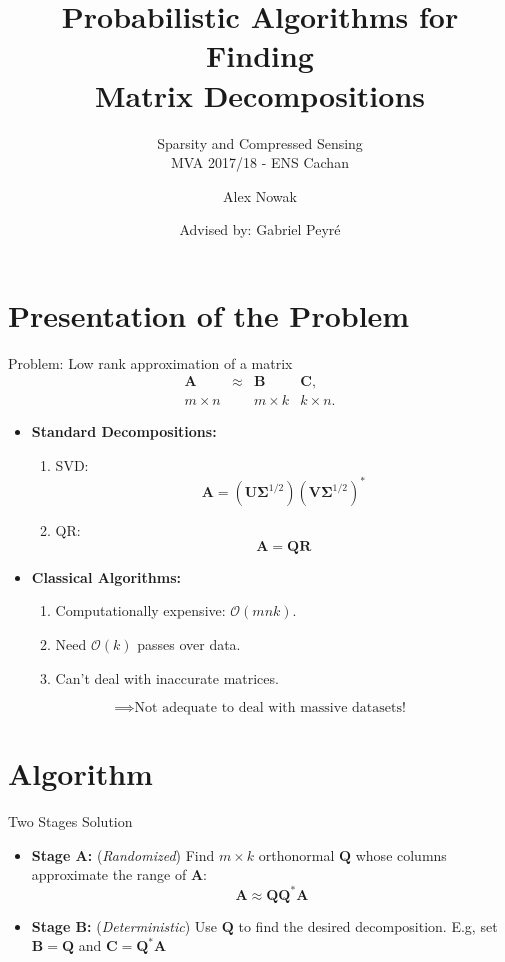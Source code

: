 \documentclass{beamer}
\title{Probabilistic Algorithms for Finding \\ Matrix Decompositions}
\subtitle{Sparsity and Compressed Sensing \\ MVA 2017/18 - ENS Cachan}
\author{Alex Nowak}
\date{Advised by: Gabriel Peyr\'e}
\newcommand{\mtx}[1]{\bm{#1}}
\newcommand{\adj}{*}
\begin{document}
\begin{frame}
  \titlepage
\end{frame}


\section{Presentation of the Problem}

\begin{frame}{Problem: Low rank approximation of a matrix}
  $$\begin{array}{ccccccccccc}
    \mtx{A} &\approx& \mtx{B} & \mtx{C},\\
    m\times n && m \times k & k\times n.
    \end{array}$$
  \begin{itemize}
  \item {
    \textbf{Standard Decompositions:}
    \begin{enumerate}
      \item SVD: $$\mtx{A}=\left(\mtx{U}\mtx{\Sigma}^{1/2}\right)\left(\mtx{V}\mtx{\Sigma}^{1/2}\right)^\adj$$
      \item QR: $$\mtx{A}=\mtx{Q}\mtx{R}$$
    \end{enumerate}
  }
  \item {
    \textbf{Classical Algorithms:}
    \begin{enumerate}
      \item Computationally expensive: $\mathcal{O}(mnk)$.
      \item Need $\mathcal{O}(k)$ passes over data.
      \item Can't deal with inaccurate matrices.
    \end{enumerate}
  }
  \end{itemize}
  $$ \implies \text{Not adequate to deal with massive datasets!} $$
\end{frame}

\section{Algorithm}

\begin{frame}{Two Stages Solution}
\begin{itemize}
  \item \textbf{Stage A:} (\textit{Randomized}) Find $m\times k$ orthonormal $\mtx{Q}$ whose columns approximate the 
  range of $\mtx{A}$:
  $$ \mtx{A} \approx \mtx{Q}\mtx{Q}^\adj\mtx{A} $$
  \item \textbf{Stage B:} (\textit{Deterministic}) Use $\mtx{Q}$ to find the desired
  decomposition. E.g, set $\mtx{B}=\mtx{Q}$ and $\mtx{C}=\mtx{Q}^\adj\mtx{A}$
\end{itemize}
\end{frame}
\end{document}
